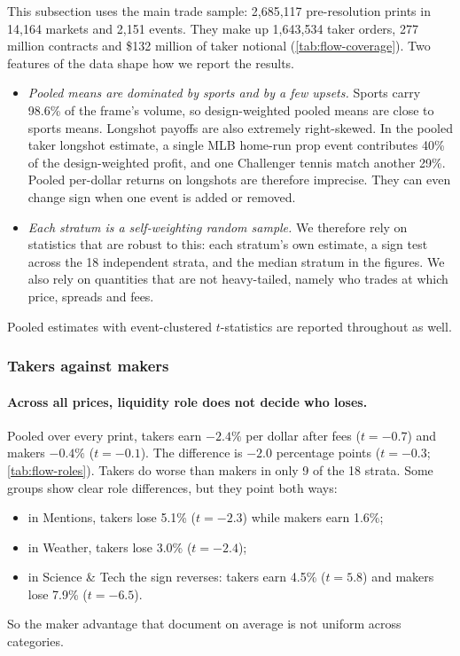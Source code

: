 This subsection uses the main trade sample: 2,685,117 pre-resolution prints in 14,164 markets and
2,151 events. They make up 1,643,534 taker orders, 277 million contracts and \$132 million of
taker notional (\cref{tab:flow-coverage}). Two features of the data shape how we report the
results.
\begin{itemize}
  \item \emph{Pooled means are dominated by sports and by a few upsets.} Sports carry 98.6\% of
  the frame's volume, so design-weighted pooled means are close to sports means. Longshot payoffs
  are also extremely right-skewed. In the pooled taker longshot estimate, a single MLB home-run
  prop event contributes 40\% of the design-weighted profit, and one Challenger tennis match
  another 29\%. Pooled per-dollar returns on longshots are therefore imprecise. They can even
  change sign when one event is added or removed.
  \item \emph{Each stratum is a self-weighting random sample.} We therefore rely on statistics
  that are robust to this: each stratum's own estimate, a sign test across the 18 independent
  strata, and the median stratum in the figures. We also rely on quantities that are not
  heavy-tailed, namely who trades at which price, spreads and fees.
\end{itemize}
Pooled estimates with event-clustered $t$-statistics are reported throughout as well.

\subsubsection{Takers against makers}\label{sec:res-flow-roles}

\paragraph{Across all prices, liquidity role does not decide who loses.} Pooled over every
print, takers earn $-2.4\%$ per dollar after fees ($t=-0.7$) and makers $-0.4\%$ ($t=-0.1$). The
difference is $-2.0$ percentage points ($t=-0.3$; \cref{tab:flow-roles}). Takers do worse than
makers in only 9 of the 18 strata. Some groups show clear role differences, but they point both
ways:
\begin{itemize}
  \item in Mentions, takers lose 5.1\% ($t=-2.3$) while makers earn 1.6\%;
  \item in Weather, takers lose 3.0\% ($t=-2.4$);
  \item in Science \& Tech the sign reverses: takers earn 4.5\% ($t=5.8$) and makers lose 7.9\%
  ($t=-6.5$).
\end{itemize}
So the maker advantage that \citet{burgi2025} document on average is not uniform across
categories.

